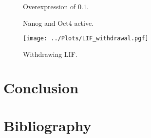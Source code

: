 \begin{figure}
\centering
\begin{minipage}[t]{0.3\textwidth}
\centering
\graphicspath{{../Plots/}}

\end{minipage}
\hfill
\begin{minipage}[t]{0.3\textwidth}
\centering
\graphicspath{{../Plots/}}

\end{minipage}
\hspace*{0.2cm}
\begin{minipage}[t]{0.3\textwidth}
\centering
\graphicspath{{../Plots/}}

\end{minipage}
\caption{Overexpression of $0.1$.}
\label{pl:NOT_0.1}
\end{figure}



\begin{figure}
\centering
\begin{minipage}[t]{0.3\textwidth}
\centering
\graphicspath{{../Plots/}}

\end{minipage}
\hspace*{0.5cm}
\begin{minipage}[t]{0.3\textwidth}
\centering
\graphicspath{{../Plots/}}

\end{minipage}
\caption{Nanog and Oct4 active.}
\label{pl:NO}
\end{figure}


\begin{figure}
\centering
\graphicspath{{../Plots/}}
\texttt{[image: ../Plots/LIF\_withdrawal.pgf]}
\caption{Withdrawing LIF.}
\label{pl:LIF_withdrawal}
\end{figure}

\section{Conclusion}

\newpage
\section*{Bibliography}
\nocite{*}
\printbibliography[heading=none, keyword={secondary}]



